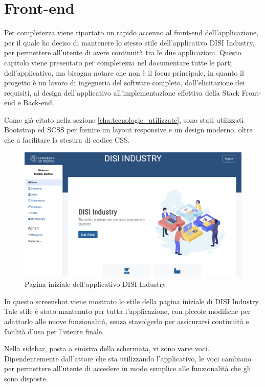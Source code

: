 \chapter{Front-end}
\label{cha:front-end}
Per completezza viene riportato un rapido accenno al front-end dell'applicazione, per il quale ho deciso di mantenere lo stesso stile dell'applicativo DISI Industry, per permettere all'utente di avere continuità tra le due applicazioni. Questo capitolo viene presentato per completezza nel documentare tutte le parti dell'applicativo, ma bisogna notare che non è il focus principale, in quanto il progetto è un lavoro di ingegneria del software completo, dall'elicitazione dei requisiti, al design dell'applicativo all'implementazione effettiva della Stack Front-end e Back-end.

Come già citato nella sezione \ref{cha:tecnologie_utilizzate}, sono stati utilizzati Bootstrap ed SCSS per fornire un layout responsive e un design moderno, oltre che a facilitare la stesura di codice CSS. 

\begin{figure}[H]
    \centering
    \includegraphics[scale=0.3]{images/home.png}
    \caption{Pagina iniziale dell'applicativo DISI Industry}
    \label{fig:home}
\end{figure}

In questo screenshot viene mostrato lo stile della pagina iniziale di DISI Industry. Tale stile è stato mantenuto per tutta l'applicazione, con piccole modifiche per adattarlo alle nuove funzionalità, senza stavolgerlo per assicurarsi continuità e facilità d'uso per l'utente finale.


Nella sidebar, posta a sinistra della schermata, vi sono varie voci. Dipendentemente dall'attore che sta utilizzando l'applicativo, le voci cambiano per permettere all'utente di accedere in modo semplice alle funzionalità che gli sono disposte.


